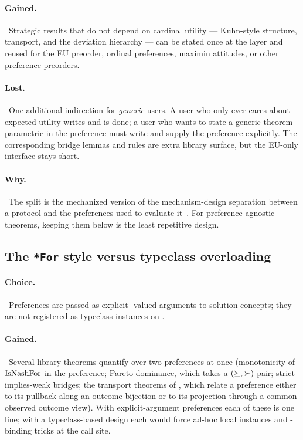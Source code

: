 \paragraph{Gained.}\ Strategic results that do not depend on
cardinal utility — Kuhn-style structure, transport, and the
deviation hierarchy — can be stated once at the  layer
and reused for the EU preorder, ordinal preferences, maximin
attitudes, or other preference preorders.

\paragraph{Lost.}\ One additional indirection for \emph{generic}
users.  A user who only ever cares about expected utility writes
 and is done; a user who wants to state a
generic theorem parametric in the preference must write
 and supply the preference
explicitly.  The corresponding bridge lemmas and  rules
are extra library surface, but the EU-only interface stays short.

\paragraph{Why.}\ The split is the mechanized version of the
mechanism-design separation between a protocol and the preferences
used to evaluate it~\citep{Myerson1991}.  For preference-agnostic
theorems, keeping them below  is the least repetitive
design.

\subsection{The \texttt{*For} style versus typeclass overloading}
\label{sec:discussion:for-style}

\paragraph{Choice.}\ Preferences are passed as explicit
-valued arguments to  solution concepts; they
are not registered as typeclass instances on .

\paragraph{Gained.}\ Several library theorems quantify over two
preferences at once (monotonicity of $\mathrm{IsNashFor}$ in the
preference; Pareto dominance, which takes a $(\succeq, \succ)$
pair; strict-implies-weak bridges; the
transport theorems of , which
relate a preference either to its pullback along an outcome
bijection or to its projection through a common observed outcome
view).
With explicit-argument preferences each of these is one line; with
a typeclass-based design each would force ad-hoc local instances
and -binding tricks at the call site.

